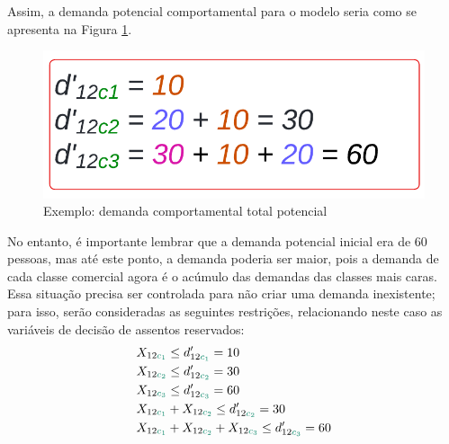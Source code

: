 Assim, a demanda potencial comportamental para o modelo seria como se apresenta na Figura \ref{fig: exemplo_dem_poten}.
\begin{figure}[H]
	\begin{center}
		\includegraphics[scale=0.24]{img/dem_compo_poten.png}
		\caption{Exemplo: demanda comportamental total potencial}
		\label{fig: exemplo_dem_poten}
	\end{center}
\end{figure}
No entanto, é importante lembrar que a demanda potencial inicial era de 60 pessoas, mas até este ponto, a demanda poderia ser maior, pois a demanda de cada classe comercial agora é o acúmulo das demandas das classes mais caras. Essa situação precisa ser controlada para não criar uma demanda inexistente; para isso, serão consideradas as seguintes restrições, relacionando neste caso as variáveis de decisão de assentos reservados:
\begin{align}
	 & X_{12\textcolor[rgb]{0.0588, 0.5412, 0.4275}{c_1}} \leq d'_{12\textcolor[rgb]{0.0588, 0.5412, 0.4275}{c_1}} = 10                        \label{eq: dem_asiig_c1}                                                                                    \\
	 & X_{12\textcolor[rgb]{0.0588, 0.5412, 0.4275}{c_2}} \leq d'_{12\textcolor[rgb]{0.0588, 0.5412, 0.4275}{c_2}} = 30                        \label{eq: dem_asiig_c2}                                                                                    \\
	 & X_{12\textcolor[rgb]{0.0588, 0.5412, 0.4275}{c_3}} \leq d'_{12\textcolor[rgb]{0.0588, 0.5412, 0.4275}{c_3}} = 60                      \label{eq: dem_asiig_c3}                                                                                      \\
	 & X_{12\textcolor[rgb]{0.0588, 0.5412, 0.4275}{c_1}} + X_{12\textcolor[rgb]{0.0588, 0.5412, 0.4275}{c_2}} \leq d'_{12\textcolor[rgb]{0.0588, 0.5412, 0.4275}{c_2}}  = 30           \label{eq: dem_compo_c2}                                           \\
	 & X_{12\textcolor[rgb]{0.0588, 0.5412, 0.4275}{c_1}} + X_{12\textcolor[rgb]{0.0588, 0.5412, 0.4275}{c_2}} + X_{12\textcolor[rgb]{0.0588, 0.5412, 0.4275}{c_3}} \leq d'_{12\textcolor[rgb]{0.0588, 0.5412, 0.4275}{c_3}} = 60 \label{eq: dem_compo_c3}
\end{align}

